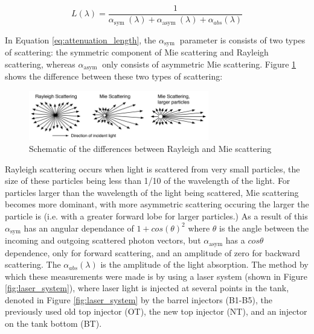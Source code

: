 \begin{equation}
L(\lambda)=\frac{1}{\alpha_{\text {sym }}(\lambda)+\alpha_{\text {asym }}(\lambda)+\alpha_{a b s}(\lambda)}
\label{eq:attenuation_length}
\end{equation}

In Equation \ref{eq:attenuation_length}, the $\alpha_{\text {sym }}$ parameter is consists of two types of scattering: the symmetric component of Mie scattering and Rayleigh scattering, whereas $\alpha_{\text {asym }}$ only consists of asymmetric Mie scattering.   Figure \ref{fig:rayleigh_mie} shows the difference between these two types of scattering:

\begin{figure}
    \centering
    \includegraphics[width=0.7\textwidth]{Figures/rayleigh_mie.png}
    \caption{Schematic of the differences between Rayleigh and Mie scattering}
    \label{fig:rayleigh_mie}
\end{figure}

Rayleigh scattering occurs when light is scattered from very small particles, the size of these particles being less than 1/10 of the wavelength of the light. For particles larger than the wavelength of the light being scattered, Mie scattering becomes more dominant, with more asymmetric scattering occuring the larger the particle is (i.e. with a greater forward lobe for larger particles.) As a result of this $\alpha_{\text {sym}}$ has an angular dependance of $1 + cos(\theta)^2$ where $\theta$ is the angle between the incoming and outgoing scattered photon vectors, but $\alpha_{\text {asym}}$ has a $cos\theta$ dependence, only for forward scattering, and an amplitude of zero for backward scattering. The $\alpha_{abs}(\lambda)$ is the amplitude of the light absorption. The method by which these measurements were made is by using a laser system (shown in Figure \ref{fig:laser_system}),  where laser light is injected at several points in the tank, denoted in Figure \ref{fig:laser_system} by the barrel injectors (B1-B5), the previously used old top injector (OT), the new top injector (NT), and an injector on the tank bottom (BT). 

